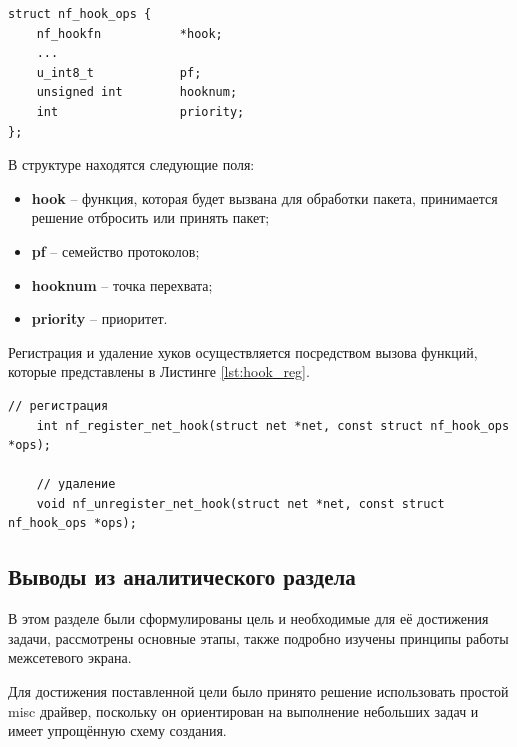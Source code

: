 \begin{lstlisting}[caption = {struct nf\_hook\_ops}, label=lst:hook]
struct nf_hook_ops {
	nf_hookfn			*hook;
	...
	u_int8_t			pf;
	unsigned int		hooknum;
	int					priority;
};
\end{lstlisting}

В структуре находятся следующие поля:
\begin{itemize}
	\item \textbf{hook} -- функция, которая будет вызвана для обработки пакета, принимается решение отбросить или принять пакет;
	
	\item \textbf{pf} -- семейство протоколов;
	
	\item \textbf{hooknum} -- точка перехвата;
	
	\item \textbf{priority} -- приоритет. \\
\end{itemize}

Регистрация и удаление хуков осуществляется посредством вызова функций, которые представлены в Листинге \ref{lst:hook_reg}.

\begin{lstlisting}[caption = {Функции для регистрации и удаления хук-функций}, label=lst:hook_reg]
	// регистрация
	int nf_register_net_hook(struct net *net, const struct nf_hook_ops *ops);
	
	// удаление
	void nf_unregister_net_hook(struct net *net, const struct nf_hook_ops *ops);
\end{lstlisting}

\subsection{Выводы из аналитического раздела}
В этом разделе были сформулированы цель и необходимые для её достижения задачи, рассмотрены основные этапы, также подробно изучены принципы работы межсетевого экрана. 

Для достижения поставленной цели было принято решение использовать простой misc драйвер, поскольку он ориентирован на выполнение небольших задач и имеет упрощённую схему создания.


 